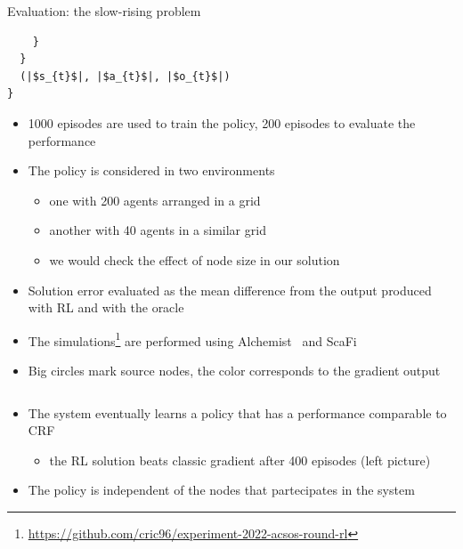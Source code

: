 \documentclass[8pt, aspectratio=169, handout]{beamer}
\begin{document}
\begin{frame}{Evaluation: the slow-rising problem}
\begin{card}
\begin{verbatim}
    }
  }
  (|$s_{t}$|, |$a_{t}$|, |$o_{t}$|) 
}
    \end{verbatim}
  \end{card}
\framebreak
  \begin{card}
    \begin{itemize}
      \item 1000 episodes are used to train the policy, 200 episodes to evaluate the performance
      \item The policy is considered in two environments 
      \begin{itemize}
        \item one with 200 agents arranged in a grid
        \item another with 40 agents in a similar grid
        \item we would check the effect of node size in our solution
      \end{itemize}
      \item Solution error evaluated as the mean difference from the output produced with RL and with the oracle
      \item The simulations\footnote{\url{https://github.com/cric96/experiment-2022-acsos-round-rl}} are performed using Alchemist~\cite{alchemist-jos2013} and ScaFi~\cite{DBLP:conf/isola/CasadeiVAD20} 
      \item Big circles mark source nodes, the color corresponds to the gradient output
    \end{itemize}
  \end{card}  
  \begin{columns}
    \begin{column}{0.3\textwidth}
    \end{column}
    \begin{column}{0.38\textwidth}
    \end{column}  
  \end{columns}
  \begin{card}[Results]
    \begin{itemize}
      \item The system eventually learns a policy that has a performance comparable to CRF
      \begin{itemize}
        \item the RL solution beats classic gradient after 400 episodes (left picture)
      \end{itemize}
      \item The policy is independent of the nodes that partecipates in the system

\end{itemize}
\end{card}
\end{frame}
\end{document}
